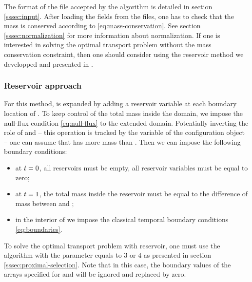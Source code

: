             

            The format of the file accepted by the algorithm is detailed in section \ref{sssec:input}.
            After loading the fields from the files, one has to check that the mass is conserved according
            to \eqref{eq:mass-conservation}. See section \ref{sssec:normalization} for more information about normalization.
            If one is interested in solving the optimal transport problem without the mass conservation constraint,
            then one should consider using the reservoir method we developped and presented in \cite{farchi-2016}.

        \subsubsection{Reservoir approach}
        \noindent

            For this method, \spaceE{} is expanded by adding a reservoir variable at each boundary location of \spaceE{}.
            To keep control of the total mass inside the domain, we impose the null-flux condition \eqref{eq:null-flux}
            to the extended domain. Potentially inverting the role of \fI{} and \fII{} -- this operation is
            tracked by the variable  of the configuration object -- one can assume that 
            \fI{} has more mass than \fII{}. Then we can impose the following boundary conditions:
            \begin{itemize}
                \item at $t=0$, all reservoirs must be empty, \ie{} all reservoir variables must be equal to zero;
                \item at $t=1$, the total mass inside the reservoir must be equal to the difference of mass between
                    \fI{} and \fII{};
                \item in the interior of \spaceE{} we impose the classical temporal boundary conditions \eqref{eq:boundaries}.
            \end{itemize}

            To solve the optimal transport problem with reservoir, one must use the \drAlgo{} algorithm with
            the parameter  equals to $3$ or $4$ as presented in section \ref{sssec:proximal-selection}.
            Note that in this case, the boundary values of the arrays specified for \fI{} and \fII{} will
            be ignored and replaced by zero.

